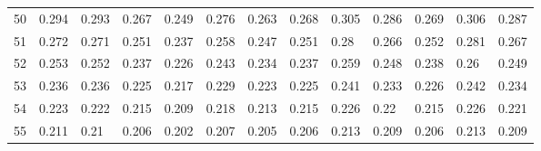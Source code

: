 \begin{table}
\begin{tabular}[c]{|l|p{0.9cm}|p{0.9cm}|p{0.9cm}|p{0.9cm}|p{0.9cm}|p{0.9cm}|p{0.9cm}|p{0.9cm}|p{0.9cm}|p{0.9cm}|p{0.9cm}|p{0.9cm}|}
50&0.294&0.293&0.267&0.249&0.276&0.263&0.268&0.305&0.286&0.269&0.306&0.287\\
51&0.272&0.271&0.251&0.237&0.258&0.247&0.251&0.28&0.266&0.252&0.281&0.267\\
52&0.253&0.252&0.237&0.226&0.243&0.234&0.237&0.259&0.248&0.238&0.26&0.249\\
53&0.236&0.236&0.225&0.217&0.229&0.223&0.225&0.241&0.233&0.226&0.242&0.234\\
54&0.223&0.222&0.215&0.209&0.218&0.213&0.215&0.226&0.22&0.215&0.226&0.221\\
55&0.211&0.21&0.206&0.202&0.207&0.205&0.206&0.213&0.209&0.206&0.213&0.209\\
		\hline
	\end{tabular}
\end{table}
\resetgeometry

